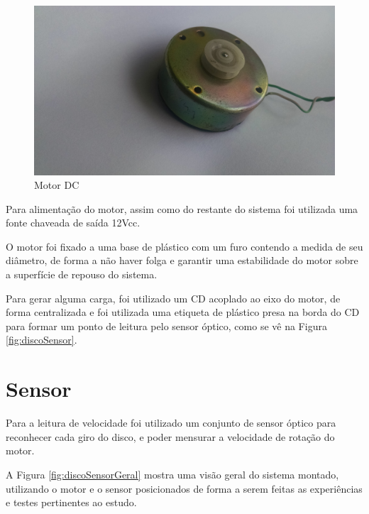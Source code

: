 \begin{figure}[!htb]
\center\includegraphics[scale=0.1, angle=0, clip=true, trim=1500 500 400 200]{./imagens/motorDC.jpg}
\caption{Motor DC}
\label{fig:motorDC}
\end{figure}

Para alimentação do motor, assim como do restante do sistema foi utilizada uma fonte chaveada de saída 12Vcc.


O motor foi fixado a uma base de plástico com um furo contendo a medida de seu diâmetro, de forma a não haver folga e garantir uma estabilidade do motor sobre a superfície de repouso do sistema.

Para gerar alguma carga, foi utilizado um CD acoplado ao eixo do motor, de forma centralizada e foi utilizada uma etiqueta de plástico presa na borda do CD para formar um ponto de leitura pelo sensor óptico, como se vê na Figura \ref{fig:discoSensor}.

\section{Sensor}

Para a leitura de velocidade foi utilizado um conjunto de sensor óptico para reconhecer cada giro do disco, e poder mensurar a velocidade de rotação do motor.

A Figura \ref{fig:discoSensorGeral} mostra uma visão geral do sistema montado, utilizando o motor e o sensor posicionados de forma a serem feitas as experiências e testes pertinentes ao estudo.

